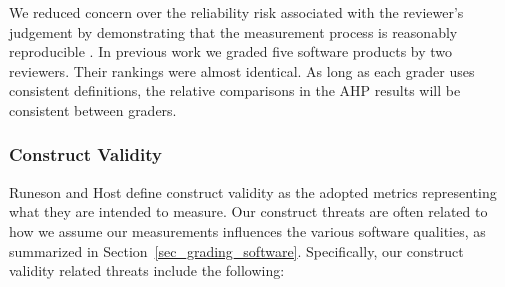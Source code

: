 \documentclass[11pt]{article}
\begin{document}
We reduced concern over the reliability risk associated with the reviewer's
judgement by demonstrating that the measurement process is reasonably
reproducible \cite{SmithEtAl2016}.  In previous work \cite{SmithEtAl2016} we
graded five software products by two reviewers. Their rankings were almost
identical. As long as each grader uses consistent definitions, the relative
comparisons in the AHP results will be consistent between graders.

\subsubsection{Construct Validity}

Runeson and Host \cite{RunesonAndHost2009} define construct validity as the
adopted metrics representing what they are intended to measure. Our construct
threats are often related to how we assume our measurements influences the
various software qualities, as summarized in Section~\ref{sec_grading_software}.
Specifically, our construct validity related threats include the following:
\end{document}
